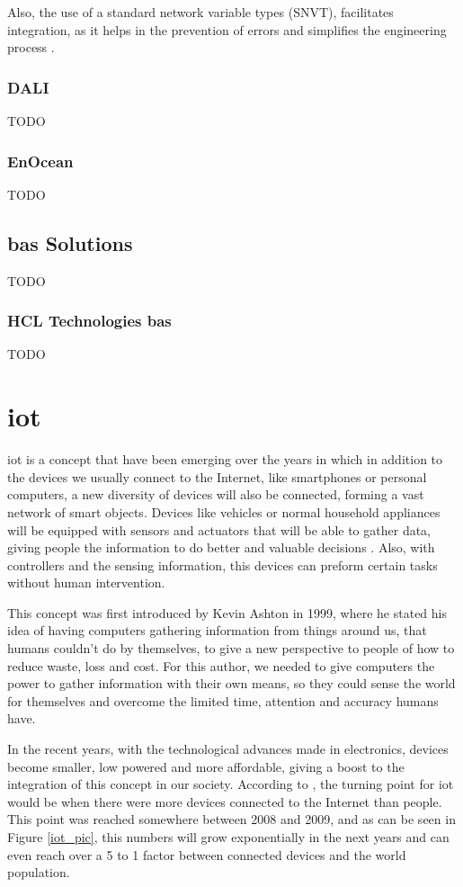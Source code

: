 Also, the use of a standard network variable types (SNVT), facilitates integration, as it helps in the prevention of errors and simplifies the engineering process \cite{Siemens2013}. 


\subsubsection{DALI}
TODO

\subsubsection{EnOcean}
TODO

\subsection{\ac{bas} Solutions}
TODO

\subsubsection{HCL Technologies \ac{bas}}
TODO

\section{\acf{iot}}

\acf{iot} is a concept that have been emerging over the years in which in addition to the devices we usually connect to the Internet, like smartphones or personal computers, a new diversity of devices will also be connected, forming a vast network of smart objects. Devices like vehicles or normal household appliances will be equipped with sensors and actuators that will be able to gather data, giving people the information to do better and valuable decisions \cite{Weiser1991}. Also, with controllers and the sensing information, this devices can preform certain tasks without human intervention.

This concept was first introduced by Kevin Ashton \cite{Ashton} in 1999, where he stated his idea of having computers gathering information from things around us, that humans couldn't do by themselves, to give a new perspective to people of how to reduce waste, loss and cost. For this author, we needed to give computers the power to gather information with their own means, so they could sense the world for themselves and overcome the limited time, attention and accuracy humans have.

In the recent years, with the technological advances made in electronics, devices become smaller, low powered and more affordable, giving a boost to the integration of this concept in our society. According to \cite{Evans2011}, the turning point for \ac{iot} would be when there were more devices connected to the Internet than people. This point was reached somewhere between 2008 and 2009, and as can be seen in Figure \ref{iot_pic}, this numbers will grow exponentially in the next years and can even reach over a 5 to 1 factor between connected devices and the world population.

